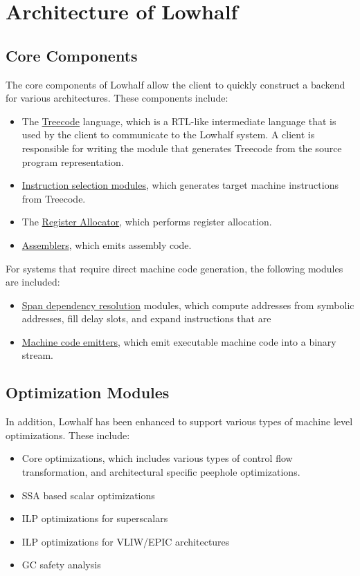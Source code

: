 \section{Architecture of Lowhalf}

\subsection{Core Components}

  The core components of Lowhalf allow the client to quickly construct 
a backend for various architectures.  These components include:
\begin{itemize}
  \item The \href{treecode.html}{Treecode} language, 
       which is a RTL-like intermediate language
       that is used by the client
       to communicate to the Lowhalf system.  A client is
       responsible for writing the module that generates Treecode from
       the source program representation.
  \item \href{instrsel.html}{Instruction selection modules}, 
      which generates target machine 
       instructions from Treecode.
  \item The \href{ra.html}{Register Allocator},
       which performs register allocation.
  \item \href{asm.html}{Assemblers}, which emits assembly code.
\end{itemize}

For systems that require direct machine code generation, the following
modules are included:
\begin{itemize}
  \item \href{span-dep.html}{Span dependency resolution} 
       modules, which compute addresses    
       from symbolic addresses,
       fill delay slots, and expand instructions that are 
  \item \href{mc.html}{Machine code emitters}, 
        which emit executable machine code into a binary stream.
\end{itemize}

\subsection{Optimization Modules}

In addition, Lowhalf has been enhanced to support various types of
machine level optimizations.  These include:

\begin{itemize}
  \item Core optimizations, which includes
       various types of control flow transformation, 
       and architectural specific peephole optimizations. 
  \item SSA based scalar optimizations
  \item ILP optimizations for superscalars
  \item ILP optimizations for VLIW/EPIC architectures
  \item GC safety analysis
\end{itemize}

